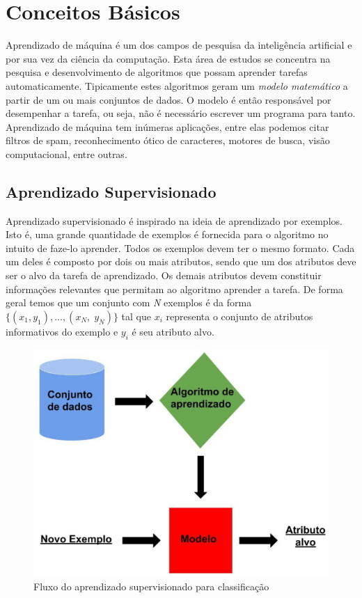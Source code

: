 \chapter{Conceitos Básicos}
\label{chap:conceitosbasicos}

Aprendizado de máquina é um dos campos de pesquisa da inteligência artificial e por sua vez da ciência da computação.
Esta área de estudos se concentra na pesquisa e desenvolvimento de algoritmos que possam aprender tarefas automaticamente.
Tipicamente estes algoritmos geram um \textit{modelo matemático} a partir de um ou mais conjuntos de dados.
O modelo é então responsável por desempenhar a tarefa, ou seja, não é necessário escrever um programa para tanto.
Aprendizado de máquina tem inúmeras aplicações, entre elas podemos citar filtros de spam, reconhecimento ótico de caracteres, motores de busca, visão computacional, entre outras.

\section{Aprendizado Supervisionado}

Aprendizado supervisionado é inspirado na ideia de aprendizado por exemplos.
Isto é, uma grande quantidade de exemplos é fornecida para o algoritmo no intuito de faze-lo aprender.
Todos os exemplos devem ter o mesmo formato.
Cada um deles é composto por dois ou mais atributos, sendo que um dos atributos deve ser o alvo da tarefa de aprendizado.
Os demais atributos devem constituir informações relevantes que permitam ao algoritmo aprender a tarefa.
De forma geral temos que um conjunto com \textit{N} exemplos é da forma $ \{(x_1, y_1), ..., (x_N,\; y_N)\} $ tal que $x_i$ representa o conjunto de atributos informativos do exemplo e $y_i$ é seu atributo alvo.

\begin{figure}[h!]
  \includegraphics[width=\linewidth]{images/conceitosbasicos01.eps}
  \caption{Fluxo do aprendizado supervisionado para classificação}
  \label{fig:conceitosbasicos01}
\end{figure}

